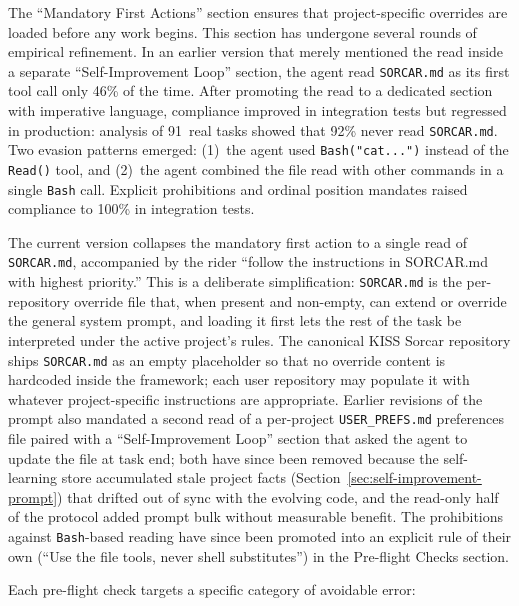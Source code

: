 \documentclass{article}
\begin{document}
\noindent The ``Mandatory First Actions'' section ensures that project-specific overrides are loaded before any work begins.  This section has undergone several rounds of empirical refinement.  In an earlier version that merely mentioned the read inside a separate ``Self-Improvement Loop'' section, the agent read \texttt{SORCAR.md} as its first tool call only 46\% of the time.  After promoting the read to a dedicated section with imperative language, compliance improved in integration tests but regressed in production: analysis of 91~real tasks showed that 92\% never read \texttt{SORCAR.md}.  Two evasion patterns emerged: (1)~the agent used \texttt{Bash("cat...")} instead of the \texttt{Read()} tool, and (2)~the agent combined the file read with other commands in a single \texttt{Bash} call.  Explicit prohibitions and ordinal position mandates raised compliance to 100\% in integration tests.

The current version collapses the mandatory first action to a single read of \texttt{SORCAR.md}, accompanied by the rider ``follow the instructions in SORCAR.md with highest priority.''  This is a deliberate simplification: \texttt{SORCAR.md} is the per-repository override file that, when present and non-empty, can extend or override the general system prompt, and loading it first lets the rest of the task be interpreted under the active project's rules.  The canonical KISS Sorcar repository ships \texttt{SORCAR.md} as an empty placeholder so that no override content is hardcoded inside the framework; each user repository may populate it with whatever project-specific instructions are appropriate.  Earlier revisions of the prompt also mandated a second read of a per-project \texttt{USER\_PREFS.md} preferences file paired with a ``Self-Improvement Loop'' section that asked the agent to update the file at task end; both have since been removed because the self-learning store accumulated stale project facts (Section~\ref{sec:self-improvement-prompt}) that drifted out of sync with the evolving code, and the read-only half of the protocol added prompt bulk without measurable benefit.  The prohibitions against \texttt{Bash}-based reading have since been promoted into an explicit rule of their own (``Use the file tools, never shell substitutes'') in the Pre-flight Checks section.

Each pre-flight check targets a specific category of avoidable error:
\end{document}
